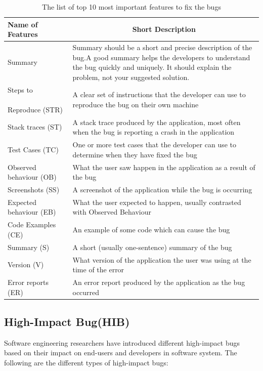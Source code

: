 \documentclass[conference]{IEEEtran}
\begin{document}
\begin{table}[!h]
\caption{The list of top 10 most important features to fix the bugs}
\label{table:usf}
\begin{center}
\begin{tabular}{|p{2.5cm} |p{5cm}|}
\hline
Name of Features & \multicolumn{1}{|c|}{Short Description }\\
\hline
Summary &Summary should be a short and precise description of the bug.A good summary helps the developers to understand the bug quickly and uniquely. It should explain the problem, not your suggested solution.  \\
\hline
Steps to \,\,\,\,\,\,\,\,\,\,\,\,\,\,\,\,\,\,\,\,\,\,\,\,\,\,\,\,\,\,\,\, Reproduce (STR) &A clear set of instructions that the developer can use to reproduce the bug on their own machine  \\
\hline
Stack traces (ST)& A stack trace produced by the application, most often when the bug is reporting a crash in the application  \\
\hline
Test Cases (TC) & One or more test cases that the developer can use to determine when they have fixed the bug \\
\hline
Observed behaviour (OB) & What the user saw happen in
the application as a result of the bug \\
\hline
Screenshots (SS) & A screenshot of the application while the bug is occurring  \\
\hline
Expected behaviour (EB) & What the user expected to happen, usually contrasted with Observed Behaviour  \\
\hline
Code Examples (CE) & An example of some code which can cause the bug \\
\hline
Summary (S) & A short (usually one-sentence) summary of the bug \\
\hline
Version (V) & What version of the application the user was using at the time of the error \\
\hline
Error reports (ER) & An error report produced by the application as the bug occurred  \\
\hline
\end{tabular}
\end{center}
\end{table}
\subsection{High-Impact Bug(HIB)}
Software engineering researchers have introduced different high-impact bugs ~\cite{Kashiwa:2014,Shihab:2011,Zimmermann:2012,Chen:2014,Shihab:2010,Ohira:2015} based on their impact on end-users and developers in software system. The following are the different types of high-impact bugs:
\end{document}
